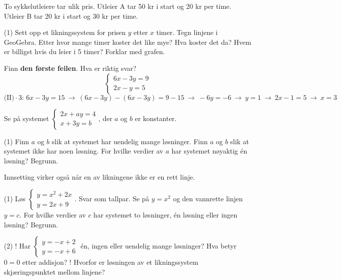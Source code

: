 To sykkelutleiere tar ulik pris. Utleier A tar 50 kr i start og 20 kr per time. Utleier B tar 20 kr i start og 30 kr per time.
\begin{tasks}(1)
  \task Sett opp et likningssystem for prisen $y$ etter $x$ timer. Tegn linjene i GeoGebra.
  \task Etter hvor mange timer koster det like mye? Hva koster det da?
  \task Hvem er billigst hvis du leier i 5 timer? Forklar med grafen.
\end{tasks}

Finn \textbf{den første feilen}. Hva er riktig svar?
\[ \begin{cases} 6x - 3y = 9\\ 2x - y = 5 \end{cases} \]
\[ \text{(II)}\cdot 3\text{: } 6x - 3y = 15 \ \to\ (6x - 3y) - (6x - 3y) = 9 - 15 \ \to\ -6y = -6 \ \to\ y = 1 \ \to\ 2x - 1 = 5 \ \to\ x = 3 \]


Se på systemet $\begin{cases} 2x + ay = 4\\ x + 3y = b \end{cases}$, der $a$ og $b$ er konstanter.
\begin{tasks}(1)
  \task Finn $a$ og $b$ slik at systemet har uendelig mange løsninger.
  \task Finn $a$ og $b$ slik at systemet ikke har noen løsning.
  \task For hvilke verdier av $a$ har systemet nøyaktig én løsning? Begrunn.
\end{tasks}

Innsetting virker også når en av likningene ikke er en rett linje.
\begin{tasks}(1)
  \task Løs $\begin{cases} y = x^2 + 2x\\ y = 2x + 9 \end{cases}$. Svar som tallpar.
  \task Se på $y = x^2$ og den vannrette linjen $y = c$. For hvilke verdier av $c$ har systemet to løsninger, én løsning eller ingen løsning? Begrunn.
\end{tasks}

\begin{sjekk}
\begin{tasks}(2)
  \task! Har $\begin{cases} y = -x + 2\\ y = -x + 6 \end{cases}$ én, ingen eller uendelig mange løsninger?
  \task Hva betyr $0 = 0$ etter addisjon?
  \task! Hvorfor er løsningen av et likningssystem skjæringspunktet mellom linjene?
\end{tasks}
\end{sjekk}
